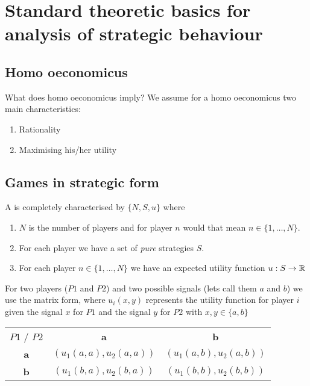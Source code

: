

\chapter{Standard theoretic basics for analysis of strategic behaviour}


\section{Homo oeconomicus} 

What does homo oeconomicus imply? We assume for a homo oeconomicus two main characteristics:
\begin{enumerate}
	\item Rationality
	\item Maximising his/her utility
\end{enumerate}


\section{Games in strategic form}
A  is completely characterised by $\{ N, S, u \}$ where
	\begin{enumerate}
		\item $N$ is the number of players and for player $n$ would that mean $n \in \{ 1, \dotsc, N \}$.
		\item For each player we have a set of \textit{pure} strategies $S$.
		\item For each player $n \in \{1, \dotsc, N \}$ we have an expected utility function $u : S \rightarrow \mathbb{R}$
	\end{enumerate}

For two players ($P1$ and $P2$) and two possible signals (lets call them $a$ and $b$) we use the matrix form, where $u_{i}(x, y)$ represents the utility function for player $i$ given the signal $x$ for $P1$ and the signal $y$ for $P2$ with $x, y \in \{ a, b\}$
\begin{center}
	\begin{tabular}{|c|c|c|}
		\hline\hline
  			$P1$ / $P2$ & \textbf{a} & \textbf{b} \\
         		\cline{1-3}
   					\textbf{a} & $( u_{1}(a, a) , u_{2}(a, a))$ & $(u_{1}(a, b), u_{2}(a, b))$	\arrayrulewidth2pt \\
            	\cline{1-3}
   					\textbf{b} & $( u_{1}(b, a), u_{2}(b, a))$ & $(u_{1}(b, b), u_{2}(b, b))$\\ \hline\hline
	\end{tabular}	
\end{center}

